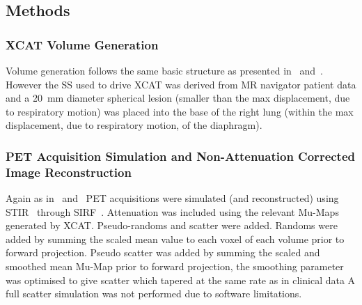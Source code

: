         \subsection{Methods} \label{sec:comparison_of_motion_correction_methods_incorporating_motion_modelling_for_pet_ct_using_a_single_breath_hold_attenuation_map_methods}
            \subsubsection{XCAT Volume Generation} \label{sec:comparison_of_motion_correction_methods_incorporating_motion_modelling_for_pet_ct_using_a_single_breath_hold_attenuation_map_xcat_volume_generation}
                Volume generation follows the same basic structure as presented in~ and~. However the \gls{SS} used to drive \gls{XCAT} was derived from \gls{MR} navigator patient data and a \SI{20}{\milli\metre} diameter spherical lesion (smaller than the max displacement, due to respiratory motion) was placed into the base of the right lung (within the max displacement, due to respiratory motion, of the diaphragm).
            
            \subsubsection{PET Acquisition Simulation and Non-Attenuation Corrected Image Reconstruction} \label{sec:comparison_of_motion_correction_methods_incorporating_motion_modelling_for_pet_ct_using_a_single_breath_hold_attenuation_map_pet_acquisition_simulation_and_non_attenuation_corrected_image_reconstruction}
                Again as in~ and~ \gls{PET} acquisitions were simulated (and reconstructed) using \gls{STIR}~\parencite{Thielemans2012, Nikos2019} through \gls{SIRF}~\parencite{Ovtchinnikov2017}. Attenuation was included using the relevant \glspl{Mu-Map} generated by \gls{XCAT}. Pseudo-randoms and scatter were added. Randoms were added by summing the scaled mean value to each voxel of each volume prior to forward projection. Pseudo scatter was added by summing the scaled and smoothed mean \gls{Mu-Map} prior to forward projection, the smoothing parameter was optimised to give scatter which tapered at the same rate as in clinical data A full scatter simulation was not performed due to software limitations.
                

